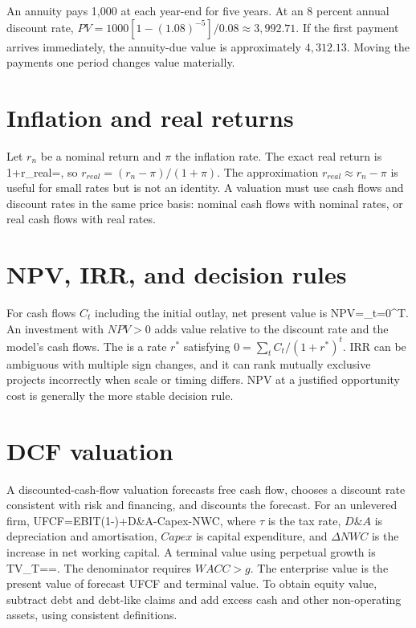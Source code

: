 \begin{worked}
An annuity pays 1,000 at each year-end for five years. At an 8 percent annual discount rate, $PV=1000[1-(1.08)^{-5}]/0.08\approx3,992.71$. If the first payment arrives immediately, the annuity-due value is approximately $4,312.13$. Moving the payments one period changes value materially.
\end{worked}

\section{Inflation and real returns}
Let $r_n$ be a nominal return and $\pi$ the inflation rate. The exact real return is
  1+r_{real}=,
\closeformula
so $r_{real}=(r_n-\pi)/(1+\pi)$. The approximation $r_{real}\approx r_n-\pi$ is useful for small rates but is not an identity. A valuation must use cash flows and discount rates in the same price basis: nominal cash flows with nominal rates, or real cash flows with real rates.

\section{NPV, IRR, and decision rules}
For cash flows $C_t$ including the initial outlay, net present value is
  NPV=\sum_{t=0}^{T}.
\closeformula
An investment with $NPV>0$ adds value relative to the discount rate and the model's cash flows. The  is a rate $r^*$ satisfying $0=\sum_tC_t/(1+r^*)^t$. IRR can be ambiguous with multiple sign changes, and it can rank mutually exclusive projects incorrectly when scale or timing differs. NPV at a justified opportunity cost is generally the more stable decision rule.

\section{DCF valuation}
A discounted-cash-flow valuation forecasts free cash flow, chooses a discount rate consistent with risk and financing, and discounts the forecast. For an unlevered firm,
  UFCF=EBIT(1-\tau)+D\&A-Capex-\Delta NWC,
\closeformula
where $\tau$ is the tax rate, $D\&A$ is depreciation and amortisation, $Capex$ is capital expenditure, and $\Delta NWC$ is the increase in net working capital. A terminal value using perpetual growth is
  TV_T==.
\closeformula
The denominator requires $WACC>g$. The enterprise value is the present value of forecast UFCF and terminal value. To obtain equity value, subtract debt and debt-like claims and add excess cash and other non-operating assets, using consistent definitions.

